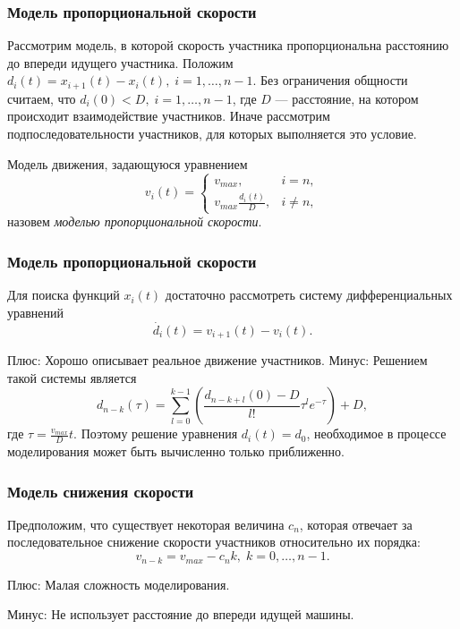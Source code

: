 \documentclass{beamer}
\begin{document}
\begin{frame}\frametitle{Модель пропорциональной скорости}
Рассмотрим модель, в которой скорость участника пропорциональна расстоянию до впереди идущего участника.
Положим $d_{i} (t) = x_{i + 1} (t) - x_{i} (t), \; i = 1, \dots, n - 1$.
Без ограничения общности считаем, что $d_{i} (0) < D, \; i = 1, \dots, n - 1$, где $D$ --- расстояние, на котором происходит взаимодействие участников. Иначе рассмотрим подпоследовательности участников, для которых выполняется это условие.

Модель движения, задающуюся уравнением
\begin{equation}
	\label{eq:micro}
	v_i(t)=
	\begin{cases}
		v_{max}, & i = n,
		\\
		v_{max} \frac{d_i(t)}{D} ,& i \ne n,
	\end{cases}
\end{equation}
назовем \textit{моделью пропорциональной скорости}.
\end{frame}

\begin{frame}\frametitle{Модель пропорциональной скорости}
	
	Для поиска функций $x_i(t)$ достаточно рассмотреть систему дифференциальных уравнений
	$$ \dot{d_i} (t) = v_{i + 1} (t) - v_i (t).$$
	
	Плюс: Хорошо описывает реальное движение участников.
	Минус: Решением такой системы является
	$$d_{n - k} (\tau) = \sum \limits_{l = 0} ^ {k - 1} \left(\frac{d_{n - k + l} (0) - D}{l!} \tau^l e ^ {-\tau}\right) + D ,$$ где ${\tau = \frac{v_{max}}{D}t}$. Поэтому решение уравнения $d_{i} (t) = d_0$, необходимое в процессе моделирования может быть вычисленно только приближенно.

\end{frame}

\begin{frame}\frametitle{Модель снижения скорости}
	
Предположим, что существует некоторая величина $c_n$, которая отвечает за последовательное снижение скорости участников относительно их порядка:
$$v_{n - k} = v_{max} - c_n k, \; k = 0, \dots, n - 1.$$

\vspace{10px}
Плюс: Малая сложность моделирования.

Минус: Не использует расстояние до впереди идущей машины.
	
\end{frame}
\end{document}
